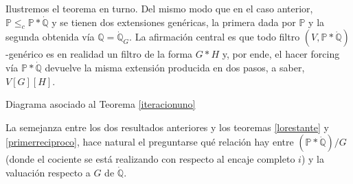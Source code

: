 \documentclass[11pt]{unam_tesis1}
\theoremstyle{MyThmStyle}
\theoremstyle{definition}
\theoremstyle{plain}
\theoremstyle{remark}
\def\dom{\mathop{\rm dom}\nolimits}
\let\leq\leqslant
\begin{document}
Ilustremos el teorema en turno. Del mismo modo que en el caso anterior, $\mathbb P\leq_c \mathbb P*\dot{\mathbb Q}$ y se tienen dos extensiones gen\'ericas, la primera dada por $\mathbb P$ y la segunda obtenida v\'ia $\mathbb Q=\dot{\mathbb Q}_G$. La afirmaci\'on central es que todo filtro $(V,\mathbb P*\dot{\mathbb Q})$-gen\'erico es en realidad un filtro de la forma $G*H$ y, por ende, el hacer forcing v\'ia $\mathbb P*\dot{\mathbb Q}$ devuelve la misma extensi\'on producida en dos pasos, a saber, $V[G][H]$.

\begin{center}


\centering

Diagrama asociado al Teorema \ref{iteracionuno}

\end{center}

La semejanza entre los dos resultados anteriores y los teoremas \ref{lorestante} y \ref{primerreciproco}, hace natural el preguntarse qu\'e relaci\'on hay entre $(\mathbb P*\dot{\mathbb Q})/G$ (donde el cociente se est\'a realizando con respecto al encaje completo $i$) y la valuaci\'on respecto a $G$ de $\dot{\mathbb Q}$.
\end{document}
